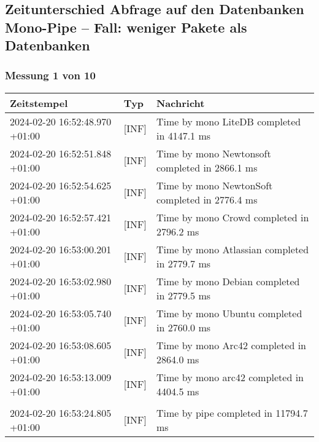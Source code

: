 \subsection{Zeitunterschied Abfrage auf den Datenbanken Mono-Pipe -- Fall: weniger Pakete als Datenbanken} \label{subsec:ZeitunterschiedAbfrageAufDenDatenbankenMonoPipeFallWenigerPaketeAlsDatenbanken}
    \subsubsection*{Messung 1 von 10} \label{subsubsec:LiteDbWenigerPaketeAlsDb1von10}
        {
            {\small
                \begin{tabularx}{\textwidth}{|l|l|X|}
                    \hline
                    \textbf{Zeitstempel} & \textbf{Typ} & \textbf{Nachricht} \\
                    \hline
                    \endhead
                    2024-02-20 16:52:48.970 +01:00 & [INF] & Time by mono LiteDB completed in 4147.1 ms \\
                    2024-02-20 16:52:51.848 +01:00 & [INF] & Time by mono Newtonsoft completed in 2866.1 ms \\
                    2024-02-20 16:52:54.625 +01:00 & [INF] & Time by mono NewtonSoft completed in 2776.4 ms \\
                    2024-02-20 16:52:57.421 +01:00 & [INF] & Time by mono Crowd completed in 2796.2 ms \\
                    2024-02-20 16:53:00.201 +01:00 & [INF] & Time by mono Atlassian completed in 2779.7 ms \\
                    2024-02-20 16:53:02.980 +01:00 & [INF] & Time by mono Debian completed in 2779.5 ms \\
                    2024-02-20 16:53:05.740 +01:00 & [INF] & Time by mono Ubuntu completed in 2760.0 ms \\
                    2024-02-20 16:53:08.605 +01:00 & [INF] & Time by mono Arc42 completed in 2864.0 ms \\
                    2024-02-20 16:53:13.009 +01:00 & [INF] & Time by mono arc42 completed in 4404.5 ms \\
                    & & \\
                    2024-02-20 16:53:24.805 +01:00 & [INF] & Time by pipe completed in 11794.7 ms \\
                    \hline
                \end{tabularx}
            }
        }

